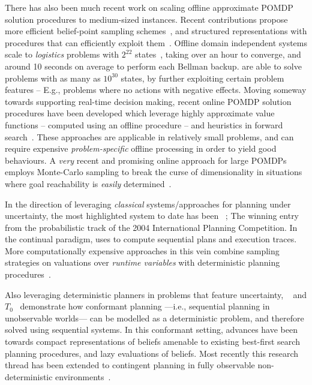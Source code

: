 There has also been much recent work on scaling offline approximate
POMDP solution procedures to medium-sized instances. Recent
contributions propose more efficient belief-point sampling
schemes~\cite{kurniawati:etal:2010,shani:etal:08}, and structured
representations with procedures that can efficiently exploit
them~\cite{brunskill:russell:2010,shani:etal:2008}. Offline domain
independent systems scale to {\em logistics} problems with $2^{22}$
states~\cite{shani:etal:2008}, taking over an hour to converge, and
around 10 seconds on average to perform each Bellman
backup. \citeauthor{brunskill:russell:2010} are able to solve problems
with as many as $10^{30}$ states, by further exploiting certain
problem features -- E.g., problems where no actions with negative
effects.
Moving someway towards supporting real-time decision making, recent
online POMDP solution procedures have been developed which leverage
highly approximate value functions -- computed using an offline
procedure -- and heuristics in forward
search~\cite{ross:etal:2008}. These approaches are applicable in
relatively small problems, and can require
expensive \emph{problem-specific} offline processing in order to yield
good behaviours.
A {\em very} recent and promising online approach for
large POMDPs employs Monte-Carlo sampling to break the curse of
dimensionality in situations where goal reachability is {\em easily}
determined~\cite{silver:veness:2010}. 


In the direction of leveraging {\em classical} systems/approaches for
planning under uncertainty, the most highlighted system to date has
been ~\cite{yoon:etal:2007}; The winning entry from
the probabilistic track of the 2004 International Planning
Competition.  In the continual paradigm, 
uses  to compute sequential plans and execution traces.
More computationally expensive approaches in this vein combine
sampling strategies on valuations over {\em runtime variables} with
deterministic planning procedures~\cite{yoon:etal:2008}. %

Also leveraging deterministic planners in problems that feature
uncertainty, ~\cite{hoffmann:brafman:2006} and
$T_0$~\cite{palacios:geffner:2009} demonstrate how conformant planning
---i.e., sequential planning in unobservable worlds--- can be modelled
as a deterministic problem, and therefore solved using sequential
systems. In this conformant setting, advances have been towards
compact representations of beliefs amenable to existing best-first
search planning procedures, and lazy evaluations of beliefs. Most
recently this research thread has been extended to contingent planning
in fully observable non-deterministic
environments~\cite{albore:etal:2009}.


